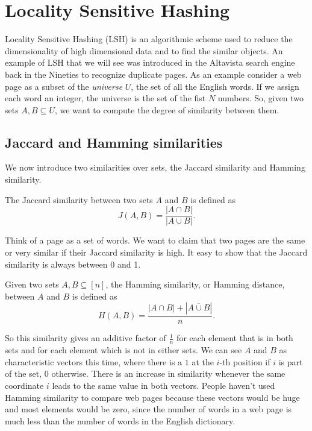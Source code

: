\chapter{Locality Sensitive Hashing}

Locality Sensitive Hashing (LSH) is an algorithmic scheme used to reduce the dimensionality of high dimensional data and to find the similar objects. An example of LSH that we will see was introduced in the Altavista search engine back in the Nineties to recognize duplicate pages. As an example consider a web page as a subset of the \emph{universe} $U$, the set of all the English words. If we assign each word an integer, the universe is the set of the fist $N$ numbers. So, given two sets $A, B \subseteq U$, we want to compute the degree of similarity between them.

\section{Jaccard and Hamming similarities}

We now introduce two similarities over sets, the Jaccard similarity and Hamming similarity.

\begin{defn}
	The Jaccard similarity between two sets $A$ and $B$ is defined as
	\begin{equation}
		J(A, B) = \frac{|A \cap B|}{|A \cup B|}.
	\end{equation}
\end{defn}

Think of a page as a set of words. We want to claim that two pages are the same or very similar if their Jaccard similarity is high. It easy to show that the Jaccard similarity is always between 0 and 1.

\begin{defn}
	Given two sets $A, B \subseteq [n]$, the Hamming similarity, or Hamming distance, between $A$ and $B$ is defined as
	\begin{equation}
		H(A, B) = \frac{|A \cap B| + |\overline{A\cup B}|}{n}.
	\end{equation}
\end{defn}

So this similarity gives an additive factor of $\frac{1}{n}$ for each element that is in both sets and for each element which is not in either sets. We can see $A$ and $B$ as characteristic vectors this time, where there is a $1$ at the $i$-th position if $i$ is part of the set, $0$ otherwise. There is an increase in similarity whenever the same coordinate $i$ leads to the same value in both vectors. People haven't used Hamming similarity to compare web pages because these vectors would be huge and most elements would be zero, since the number of words in a web page is much less than the number of words in the English dictionary.


